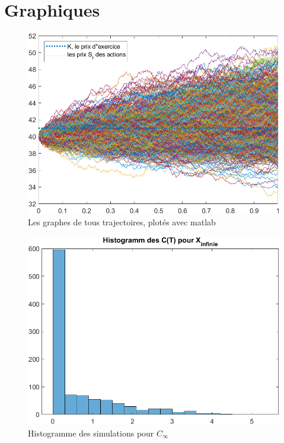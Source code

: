 \documentclass[a4paper,12pt]{scrartcl}
\begin{document}
\section{Graphiques} \label{graphiques}

\begin{figure}[h!]
  \begin{center}
    \includegraphics[width=14cm]{"graphiques/S.png"}
    \caption{Les graphes de tous trajectoires, plotés avec matlab}
    \label{fig:S}
  \end{center}
\end{figure}

\begin{figure}[h!]
  \begin{center}
    \includegraphics[width=14cm]{"graphiques/hist_C_inf.png"}
    \caption{Histogramme des simulations pour $C_{\infty}$}
    \label{fig:hist_C_inf}
  \end{center}
\end{figure}
\end{document}
